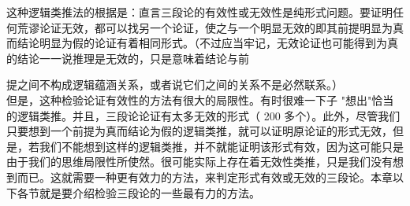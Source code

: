 这种逻辑类推法的根据是：直言三段论的有效性或无效性是纯形式问题。要证明任何荒谬论证无效，都可以找另一个论证，使之与一个明显无效的即其前提明显为真而结论明显为假的论证有着相同形式。（不过应当牢记，无效论证也可能得到为真的结论一一说推理是无效的，只是意味着结论与前

提之间不构成逻辑蕴涵关系，或者说它们之间的关系不是必然联系。）\\
但是，这种检验论证有效性的方法有很大的局限性。有时很难一下子 "想出"恰当的逻辑类推。并且，三段论论证有太多无效的形式（ 200 多个）。此外，尽管我们只要想到一个前提为真而结论为假的逻辑类推，就可以证明原论证的形式无效，但是，若我们不能想到这样的逻辑类推，并不就能证明该形式有效，因为这可能只是由于我们的思维局限性所使然。很可能实际上存在着无效性类推，只是我们没有想到而已。这就需要一种更有效力的方法，来判定形式有效或无效的三段论。本章以下各节就是要介绍检验三段论的一些最有力的方法。 